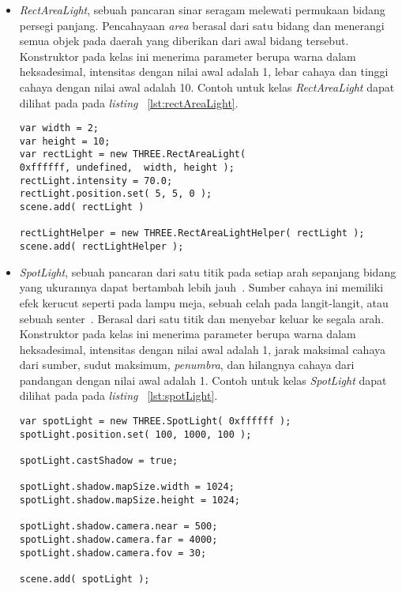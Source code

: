 \begin{itemize}
\begin{itemize}
		\item {\it RectAreaLight}, sebuah pancaran sinar seragam melewati permukaan bidang persegi panjang. Pencahayaan {\it area} berasal dari satu bidang dan menerangi semua objek pada daerah yang diberikan dari awal bidang tersebut\cite{shadingConcept}. Konstruktor pada kelas ini menerima parameter berupa warna dalam heksadesimal, intensitas dengan nilai awal adalah 1, lebar cahaya dan tinggi cahaya dengan nilai awal adalah 10. Contoh untuk kelas {\it RectAreaLight} dapat dilihat pada pada {\it listing} ~\ref{lst:rectAreaLight}.
\begin{lstlisting}[caption={Contoh penggunaan kelas {\it RectAreaLight}.}, label={lst:rectAreaLight},captionpos=b]
var width = 2;
var height = 10;
var rectLight = new THREE.RectAreaLight(
0xffffff, undefined,  width, height );
rectLight.intensity = 70.0;
rectLight.position.set( 5, 5, 0 );
scene.add( rectLight )

rectLightHelper = new THREE.RectAreaLightHelper( rectLight );
scene.add( rectLightHelper );
\end{lstlisting}
		\item {\it SpotLight}, sebuah pancaran dari satu titik pada setiap arah sepanjang bidang yang ukurannya dapat bertambah lebih jauh~\cite{threejs}. Sumber cahaya ini memiliki efek kerucut seperti pada lampu meja, sebuah celah pada langit-langit, atau sebuah senter~\cite{learningThreejs}. Berasal dari satu titik dan menyebar keluar ke segala arah\cite{shadingConcept}. Konstruktor pada kelas ini menerima parameter berupa warna dalam heksadesimal, intensitas dengan nilai awal adalah 1, jarak maksimal cahaya dari sumber, sudut maksimum, {\it penumbra}, dan hilangnya cahaya dari pandangan dengan nilai awal adalah 1. Contoh untuk kelas {\it SpotLight} dapat dilihat pada pada {\it listing} ~\ref{lst:spotLight}.
	
\begin{lstlisting}[caption={Contoh penggunaan kelas {\it SpotLight}.}, label={lst:spotLight},captionpos=b]
var spotLight = new THREE.SpotLight( 0xffffff );
spotLight.position.set( 100, 1000, 100 );

spotLight.castShadow = true;

spotLight.shadow.mapSize.width = 1024;
spotLight.shadow.mapSize.height = 1024;

spotLight.shadow.camera.near = 500;
spotLight.shadow.camera.far = 4000;
spotLight.shadow.camera.fov = 30;

scene.add( spotLight );
\end{lstlisting}
	\end{itemize}
	

\end{itemize}
